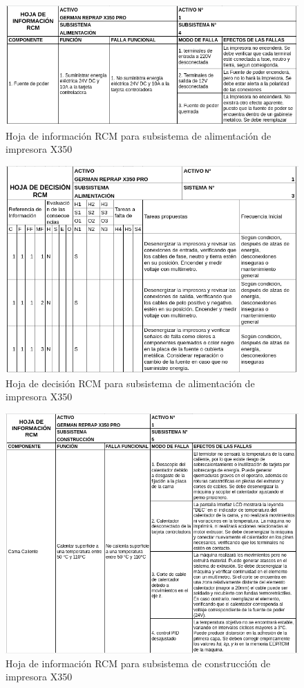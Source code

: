 \begin{figure}[H]
\centering
\includegraphics[scale=0.65]{images/amef41.png}
\caption{Hoja de información RCM para subsistema de alimentación de impresora X350}
\end{figure}

\begin{figure}[H]
\centering
\includegraphics[scale=0.7]{images/decision41.png}
\caption{Hoja de decisión RCM para subsistema de alimentación de impresora X350}
\end{figure}

\begin{figure}[H]
\centering
\includegraphics[scale=0.7]{images/amef51.png}
\caption{Hoja de información RCM para subsistema de construcción de impresora X350}
\end{figure}

